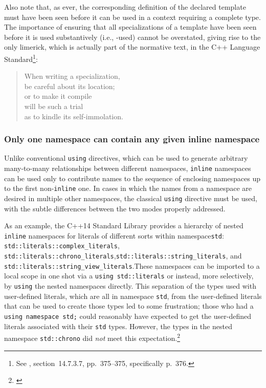 \noindent Also note that, as ever, the corresponding definition of the declared
template must have been seen before it can be used in a context
requiring a complete type. The importance of ensuring that all
specializations of a template have been seen before it is used
substantively (i.e., -used) cannot be overstated, giving
rise to the only limerick, which is actually part of the normative text,
in the C++ Language Standard{\cprotect\footnote{See \cite{iso11},
  section~14.7.3.7, pp.~375--375, specifically p.~376.}}:
\begin{quote}
When writing a specialization,\\
be careful about its location;\\
or to make it compile\\
will be such a trial\\
as to kindle its self-immolation.
\end{quote}

\subsubsection[Only one namespace can contain any given \lstinline!inline! namespace]{Only one namespace can contain any given {\SubsubsecCode inline} namespace}\label{only-one-namespace-can-contain-any-given-inline-namespace}

Unlike conventional \lstinline!using! directives, which can be used to
generate arbitrary many-to-many relationships between different
namespaces, \lstinline!inline! namespaces can be used only to contribute
names to the sequence of enclosing namespaces up to the first
non-\lstinline!inline! one. In cases in which the names from a namespace
are desired in multiple other namespaces, the classical \lstinline!using!
directive must be used, with the subtle differences between the two
modes properly addressed.

As an example, the C++14 Standard Library provides a hierarchy of nested
\lstinline!inline! namespaces for literals of different sorts within
namespace\linebreak[4] \lstinline!std!: \lstinline!std::literals::complex_literals!,
\lstinline!std::literals::chrono_literals!,\linebreak[4]
\lstinline!std::literals::string_literals!, and
\lstinline!std::literals::string_view_literals!.\linebreak[4]
These namespaces can
be imported to a local scope in one shot via a
\lstinline!using!~\lstinline!std::literals! or instead, more selectively, by
\lstinline!using! the nested namespaces directly. This separation of the
types used with user-defined literals, which are all in namespace
\lstinline!std!, from the user-defined literals that can be used to create
those types led to some frustration; those who had a
\lstinline!using!~\lstinline!namespace!~\lstinline!std;! could reasonably have
expected to get the user-defined literals associated with their
\lstinline!std! types. However, the types in the nested namespace
\lstinline!std::chrono! did \emph{not} meet this
expectation.{\cprotect\footnote{\cite{hinnant17}}}

